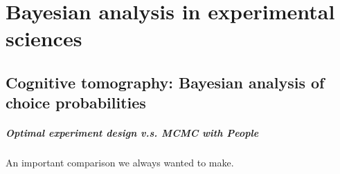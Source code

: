 \part{Bayesian analysis in experimental sciences}

\chapter{Cognitive tomography: Bayesian analysis of choice probabilities}

\subsubsection{Optimal experiment design v.s. MCMC with People}
An important comparison we always wanted to make.


